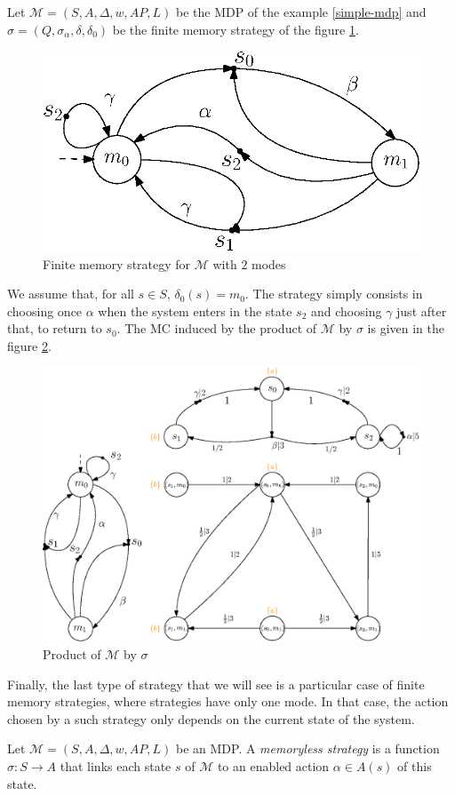 \begin{example}
  Let $\mathcal{M}=(S, A, \Delta, w, AP, L)$ be the MDP of the example \ref{simple-mdp} and $\sigma = (Q, \sigma_\alpha, \delta, \delta_0)$ be the
  finite memory strategy of the figure \ref{finite_mem_strat}.
  \begin{figure}[h!]
    \centering
    \includegraphics[width=0.4\linewidth]{resources/strategy}
    \caption{Finite memory strategy for $\mathcal{M}$ with $2$ modes}\label{finite_mem_strat}
  \end{figure}

  We assume that, for all $s \in S$, $\delta_0(s) = m_0$. The strategy simply consists in choosing once $\alpha$ when the system enters in the state $s_2$ and choosing $\gamma$ just after that, to return to $s_0$. The MC induced by the product of $\mathcal{M}$ by $\sigma$ is given in the figure
  \ref{inducedMC}.
  \begin{figure}[H]
    \centering
    \includegraphics[width=0.55\linewidth]{resources/inductedmarkov}
    \caption{Product of $\mathcal{M}$ by $\sigma$}\label{inducedMC}
  \end{figure}
\end{example}

Finally, the last type of strategy that we will see is a particular case of finite memory strategies, where strategies have only one mode.
In that case, the action chosen by a such strategy only depends on the current state of the system.

\begin{definition}
  Let $\mathcal{M}=(S, A, \Delta, w, AP, L)$ be an MDP. A \textit{memoryless strategy} is a function
  $
    \sigma: S \rightarrow A
  $ that links each state $s$ of $\mathcal{M}$ to an enabled action $\alpha \in A(s)$ of this state.
\end{definition}

